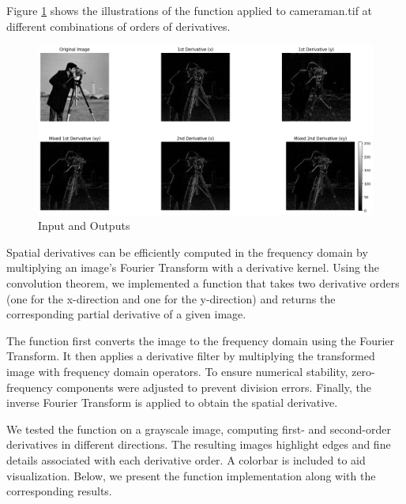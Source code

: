 \documentclass[12pt]{article}
\begin{document}
Figure \ref{fig:3.3} shows the illustrations of the function applied to cameraman.tif at different combinations of orders of derivatives.

\begin{figure}[ht]
        \centering
      \includegraphics[width=1.0\columnwidth, keepaspectratio]{pics/a3-3.3.png}
        \caption[]{Input and Outputs}
    \label{fig:3.3}
    \end{figure}

Spatial derivatives can be efficiently computed in the frequency domain by multiplying an image’s Fourier Transform with a derivative kernel. Using the convolution theorem, we implemented a function that takes two derivative orders (one for the x-direction and one for the y-direction) and returns the corresponding partial derivative of a given image.

The function first converts the image to the frequency domain using the Fourier Transform. It then applies a derivative filter by multiplying the transformed image with frequency domain operators. To ensure numerical stability, zero-frequency components were adjusted to prevent division errors. Finally, the inverse Fourier Transform is applied to obtain the spatial derivative.

We tested the function on a grayscale image, computing first- and second-order derivatives in different directions. The resulting images highlight edges and fine details associated with each derivative order. A colorbar is included to aid visualization. Below, we present the function implementation along with the corresponding results.
\end{document}

